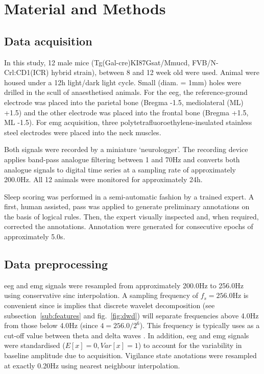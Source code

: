 \section{Material and Methods} \label{matmet}

\subsection{Data acquisition}
In this study, 12 male mice (Tg(Gal-cre)KI87Gsat/Mmucd, FVB/N-Crl:CD1(ICR) hybrid strain),
between 8 and 12 week old were used.
Animal were housed under a 12h light/dark light cycle.
Small (diam. = 1mm) holes were drilled in the scull of anaesthetised animals.
For the  \gls{eeg}, the reference-ground electrode was placed into the parietal bone (Bregma -1.5, mediolateral (ML) +1.5) and
 the other electrode was placed into the frontal bone (Bregma +1.5, ML -1.5).
For \gls{emg} acquisition, three polytetrafluoroethylene-insulated stainless steel electrodes were placed into the neck muscles.

Both signals were recorded by a miniature
`neurologger'\cite{vyssotski_miniature_2006}.
The recording device applies band-pass analogue filtering between 1 and 70Hz and converts both analogue signals to digital time series at a sampling rate of approximately 200.0Hz.
All 12 animals were monitored for approximately 24h.

Sleep scoring was performed in a semi-automatic fashion by a trained
expert.
A first, human assisted, pass was applied to generate preliminary annotations on the basis of logical rules\cite{costa-miserachs_automated_2003}.
Then, the expert visually inspected and, when required, corrected the annotations.
Annotation were generated for consecutive epochs of approximately 5.0s.
\subsection{Data preprocessing}

\gls{eeg} and \gls{emg} signals were resampled from approximately 200.0Hz to 256.0Hz using
conservative sinc interpolation\cite{putnam_design_1997}.
A sampling frequency of $f_s  = 256.0$Hz is convenient since is implies that discrete wavelet decomposition (see subsection~\ref{sub:features} and fig.~\ref{fig:dwd}) will separate
frequencies above 4.0Hz from those below 4.0Hz (since $4 = 256.0/{2^6} $).
This frequency is typically uses as a cut-off value between theta and delta
waves \cite{vyazovskiy_nrem_2014}.
In addition, \gls{eeg} and \gls{emg} signals were standardised ($E[x] = 0, Var[x] = 1$) to account for the variability in baseline amplitude due to acquisition.
Vigilance state anotations were resampled at exactly 0.20Hz using nearest neighbour interpolation.

